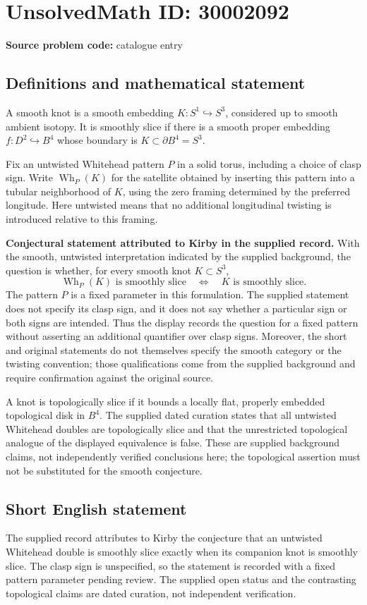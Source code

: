 \documentclass[11pt]{article}
\begin{document}
\section*{UnsolvedMath ID: 30002092}
\textbf{Source problem code:} catalogue entry
\subsection{Definitions and mathematical statement}
A smooth knot is a smooth embedding \(K:S^1\hookrightarrow S^3\), considered up to smooth ambient isotopy. It is smoothly slice if there is a smooth proper embedding \(f:D^2\hookrightarrow B^4\) whose boundary is \(K\subset\partial B^4=S^3\).

Fix an untwisted Whitehead pattern \(P\) in a solid torus, including a choice of clasp sign. Write \(\operatorname{Wh}_{P}(K)\) for the satellite obtained by inserting this pattern into a tubular neighborhood of \(K\), using the zero framing determined by the preferred longitude. Here untwisted means that no additional longitudinal twisting is introduced relative to this framing.

\textbf{Conjectural statement attributed to Kirby in the supplied record.} With the smooth, untwisted interpretation indicated by the supplied background, the question is whether, for every smooth knot \(K\subset S^3\),
\[
\operatorname{Wh}_{P}(K)\text{ is smoothly slice}
\quad\Longleftrightarrow\quad
K\text{ is smoothly slice}.
\]
The pattern \(P\) is a fixed parameter in this formulation. The supplied statement does not specify its clasp sign, and it does not say whether a particular sign or both signs are intended. Thus the display records the question for a fixed pattern without asserting an additional quantifier over clasp signs. Moreover, the short and original statements do not themselves specify the smooth category or the twisting convention; those qualifications come from the supplied background and require confirmation against the original source.

A knot is topologically slice if it bounds a locally flat, properly embedded topological disk in \(B^4\). The supplied dated curation states that all untwisted Whitehead doubles are topologically slice and that the unrestricted topological analogue of the displayed equivalence is false. These are supplied background claims, not independently verified conclusions here; the topological assertion must not be substituted for the smooth conjecture.
\subsection{Short English statement}
The supplied record attributes to Kirby the conjecture that an untwisted Whitehead double is smoothly slice exactly when its companion knot is smoothly slice. The clasp sign is unspecified, so the statement is recorded with a fixed pattern parameter pending review. The supplied open status and the contrasting topological claims are dated curation, not independent verification.
\end{document}
